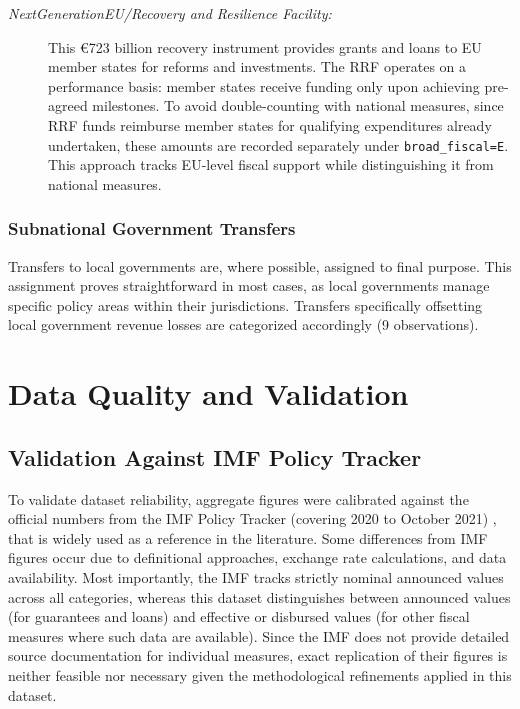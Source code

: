 \documentclass[12pt]{article}
\begin{document}
\begin{description}
    \item[\textit{NextGenerationEU/Recovery and Resilience Facility:}] 
    This €723 billion recovery instrument provides grants and loans to EU member states for reforms and investments. The RRF operates on a performance basis: member states receive funding only upon achieving pre-agreed milestones. To avoid double-counting with national measures, since RRF funds reimburse member states for qualifying expenditures already undertaken, these amounts are recorded separately under \texttt{broad\_fiscal=E}. This approach tracks EU-level fiscal support while distinguishing it from national measures.

\end{description}



\subsubsection{Subnational Government Transfers}

Transfers to local governments are, where possible, assigned to final purpose. This assignment proves straightforward in most cases, as local governments manage specific policy areas within their jurisdictions. Transfers specifically offsetting local government revenue losses are categorized accordingly (9 observations).

\section{Data Quality and Validation}

\subsection{Validation Against IMF Policy Tracker}

To validate dataset reliability, aggregate figures were calibrated against the official numbers from the IMF Policy Tracker (covering 2020 to October 2021) \citep{IMFPolicyResponsesCovid19}, that is widely used as a reference in the literature. Some differences from IMF figures occur due to definitional approaches, exchange rate calculations, and data availability. Most importantly, the IMF tracks strictly nominal announced values across all categories, whereas this dataset distinguishes between announced values (for guarantees and loans) and effective or disbursed values (for other fiscal measures where such data are available). Since the IMF does not provide detailed source documentation for individual measures, exact replication of their figures is neither feasible nor necessary given the methodological refinements applied in this dataset.
\vspace{3mm}
\end{document}
